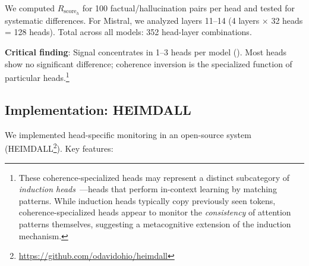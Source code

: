 \documentclass[11pt,twocolumn]{article}
\newcommand{\rscore}{R_{\text{score}}}
\begin{document}
We computed $\rscore_h$ for 100 factual/hallucination pairs per head and tested for systematic differences. For Mistral, we analyzed layers 11--14 (4 layers $\times$ 32 heads = 128 heads). Total across all models: 352 head-layer combinations.

\textbf{Critical finding}: Signal concentrates in 1--3 heads per model (). Most heads show no significant difference; coherence inversion is the specialized function of particular heads.\footnote{These coherence-specialized heads may represent a distinct subcategory of \textit{induction heads}~\cite{olsson2022context}---heads that perform in-context learning by matching patterns. While induction heads typically copy previously seen tokens, coherence-specialized heads appear to monitor the \textit{consistency} of attention patterns themselves, suggesting a metacognitive extension of the induction mechanism.}

\begin{table}[h]
\centering
{}
\caption{Top coherence-specialized heads. Large effect sizes ($d > 1.0$) and high AUC ($> 0.75$).}
\label{tab:heads}
\end{table}

\subsection{Implementation: HEIMDALL}

We implemented head-specific monitoring in an open-source system (HEIMDALL\footnote{\url{https://github.com/odavidohio/heimdall}}). Key features:
\end{document}
